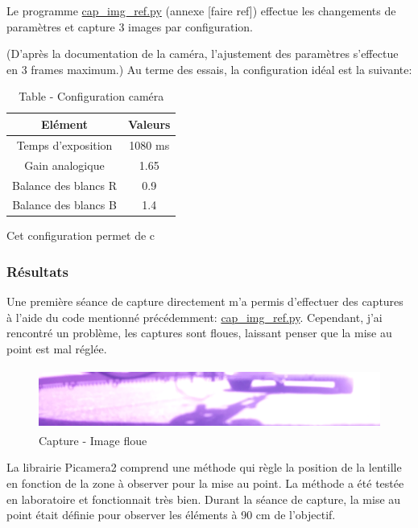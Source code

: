 Le programme \underline{cap\_img\_ref.py} (annexe [faire ref]) effectue les changements de paramètres et capture 3 images par configuration.

(D'après la documentation de la caméra, l'ajustement des paramètres s'effectue en 3 frames maximum.)
Au terme des essais, la configuration idéal est la suivante:

\begin{table}[H]
    \begin{center}
        \caption{Table - Configuration caméra}
        \begin{tabular}{|c|c|}
            Elément              & Valeurs                 \\ \hline
            Temps d'exposition   & 1080 \si{\milli\second} \\
            Gain analogique      & 1.65                    \\
            Balance des blancs R & 0.9                     \\
            Balance des blancs B & 1.4                     \\
        \end{tabular}
    \end{center}
\end{table}

Cet configuration permet de c
\subsubsection{Résultats}
Une première séance de capture directement m'a permis d'effectuer des captures à l'aide du code mentionné précédemment: \underline{cap\_img\_ref.py}. Cependant, j'ai rencontré un problème, les captures sont floues, laissant penser que la mise au point est mal réglée.

\begin{figure}[H]
    \centering
    \includegraphics[height=2cm]{assets/figures/capture_floue.png}
    \caption{Capture - Image floue}
\end{figure}

La librairie Picamera2 \cite{picamera2} comprend une méthode qui règle la position de la lentille en fonction de la zone à observer pour la mise au point. La méthode a été testée en laboratoire et fonctionnait très bien. Durant la séance de capture,
la mise au point était définie pour observer les éléments à 90 \si{\centi\meter} de l'objectif.

